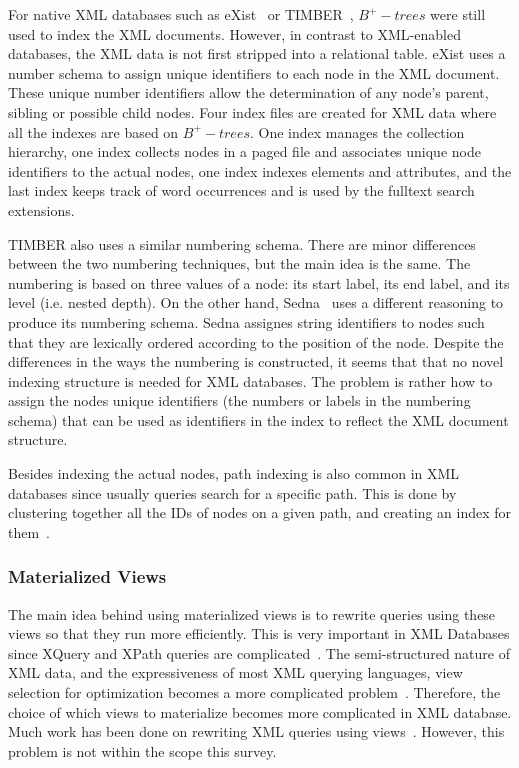 \documentclass[12pt,a4paper]{article}
\begin{document}
For native XML databases such as eXist~\cite{meier2009exist} or TIMBER~\cite{jagadish2002timber}, $B^{+}-trees$ were still used to index the XML documents.
However, in contrast to XML-enabled databases, the XML data is not first stripped into a relational table. eXist uses a number schema to assign unique
identifiers to each node in the XML document. These unique number identifiers allow the determination of any node's parent, sibling or possible child nodes.
Four index files are created for XML data where all the indexes are based on $B^{+}-trees$. One index manages the collection hierarchy, one index collects nodes
in a paged file and associates unique node identifiers to the actual nodes, one index indexes elements and attributes, and the last index keeps track of word
occurrences and is used by the fulltext search extensions.


TIMBER also uses a similar numbering schema. There are minor differences between the two numbering techniques, but the main idea is the same. The numbering is
based on three values of a node: its start label, its end label, and its level (i.e. nested depth). On the other hand, Sedna~\cite{taranov2010sedna} uses a
different reasoning to produce its numbering schema. Sedna assignes string identifiers to nodes such that they are lexically ordered according to the position
of the node. Despite the differences in the ways the numbering is constructed, it seems that that no novel indexing structure is needed for XML databases. The
problem is rather how to assign the nodes unique identifiers (the numbers or labels in the numbering schema) that can be used as identifiers in the index to
reflect the XML document structure.

Besides indexing the actual nodes, path indexing is also common in XML databases since usually queries search for a specific path. This is done by clustering
together all the IDs of nodes on a given path, and creating an index for them~\cite{milo1999index, arion2008path}.

\subsubsection{Materialized Views}

The main idea behind using materialized views is to rewrite queries using these views so that they run more efficiently. This is very important in XML
Databases since XQuery and XPath queries are complicated~\cite{arion2007structured}. The semi-structured nature of
XML data, and the expressiveness of most XML querying languages, view selection for optimization becomes a more complicated
problem~\cite{tang2009materialized}. Therefore, the choice of which views to materialize becomes more complicated in XML database. Much work has been
done on rewriting XML queries using views~\cite{arion2007structured, balmin2004framework, aouiche2006clustering, tang2008multiple}. However, this problem is not
within the scope this survey.
\end{document}
